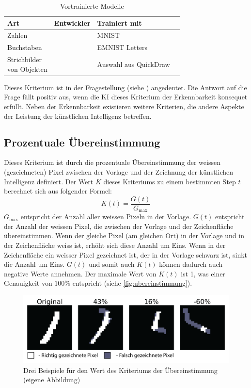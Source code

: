 \begin{table}[!ht]
  \centering
  \begin{tabular}{|l|l|l|l|}
  \hline
      Art & Entwickler & Trainiert mit \\ \hline
      Zahlen & \cite{mazzia__2022} & MNIST \\ \hline
      Buchstaben & \cite{mor_emnist_2022} & EMNIST Letters \\ \hline
      \makecell{Strichbilder\\von Objekten} & \cite{lam_linus_keras_2022} & Auswahl aus QuickDraw \\ \hline
  \end{tabular}
  \caption{Vortrainierte Modelle}
  \label{tab:models}
\end{table}

Dieses Kriterium ist in der Fragestellung (siehe )
angedeutet. Die Antwort auf die Frage fällt positiv aus, wenn die KI dieses
Kriterium der Erkennbarkeit konsequet erfüllt. Neben der Erkennbarkeit
existieren weitere Kriterien, die andere Aspekte der Leistung der künstlichen
Intelligenz betreffen.

\subsection{Prozentuale Übereinstimmung}
\label{sub:m_eval_proc}
Dieses Kriterium ist durch die prozentuale Übereinstimmung der weissen
(gezeichneten) Pixel zwischen der Vorlage und der Zeichnung der künstlichen
Intelligenz definiert. Der Wert $K$ dieses Kriteriums zu einem bestimmten Step
$t$ berechnet sich aus folgender Formel:
\[ K(t) = \frac{G(t)}{G_{\max}} \]
$G_{\max}$ entspricht der Anzahl aller weissen Pixeln in der Vorlage. $G(t)$
entspricht der Anzahl der weissen Pixel, die zwischen der Vorlage und der
Zeichenfläche übereinstimmen. Wenn der gleiche Pixel (am gleichen Ort) in der
Vorlage und in der Zeichenfläche weiss ist, erhöht sich diese Anzahl um Eins.
Wenn in der Zeichenfläche ein weisser Pixel gezeichnet ist, der in der Vorlage
schwarz ist, sinkt die Anzahl um Eins. $G(t)$ und somit auch $K(t)$ können
dadurch auch negative Werte annehmen. Der maximale Wert von $K(t)$ ist 1, was
einer Genauigkeit von $100\%$ entspricht (siehe \autoref{fig:ubereinstimmung}).

\begin{figure}[!ht]
  \centering
  \includegraphics[width=\textwidth]{images/methode/ubereinstimm.png}
  \caption{Drei Beispiele für den Wert des Kriteriums der Übereinstimmung (eigene Abbildung)}
  \label{fig:ubereinstimmung}
\end{figure}

